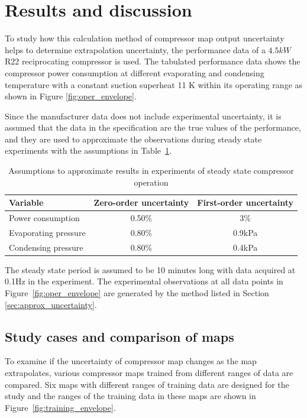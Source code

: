 \section{Results and discussion}
\label{sec:results_discussion}
To study how this calculation method of compressor map output uncertainty helps to determine extrapolation uncertainty, the performance data of a $4.5 kW$ R22 reciprocating compressor is used. The tabulated performance data shows the compressor power consumption at different evaporating and condensing temperature with a constant suction superheat 11 K within its operating range as shown in Figure \ref{fig:oper_envelope}.

Since the manufacturer data does not include experimental uncertainty, it is assumed that the data in the specification are the true values of the performance, and they are used to approximate the observations during steady state experiments with the assumptions in Table~\ref{tab:study_assumptions}.

\begin{table}[htbp]
  \centering
  \caption{Assumptions to approximate results in experiments of steady state compressor operation}
    \begin{tabular}{lcc}
    \toprule
    \textbf{Variable} & \textbf{Zero-order uncertainty} & \textbf{First-order uncertainty} \\
    \midrule
    Power consumption & 0.50\% & 3\% \\
    Evaporating pressure & 0.80\% & 0.9kPa \\
    Condensing pressure & 0.80\% & 0.4kPa \\
    \bottomrule
    \end{tabular}%
  \label{tab:study_assumptions}%
\end{table}%

The steady state period is assumed to be 10 minutes long with data acquired at 0.1Hz in the experiment. The experimental observations at all data points in Figure~\ref{fig:oper_envelope} are generated by the method listed in Section \ref{sec:approx_uncertainty}.\\

\subsection{Study cases and comparison of maps}
\label{sec:study_cases}

To examine if the uncertainty of compressor map changes as the map extrapolates, various compressor maps trained from different ranges of data are compared. Six maps with different ranges of training data are designed for the study and the ranges of the training data in these maps are shown in Figure~\ref{fig:training_envelope}.

